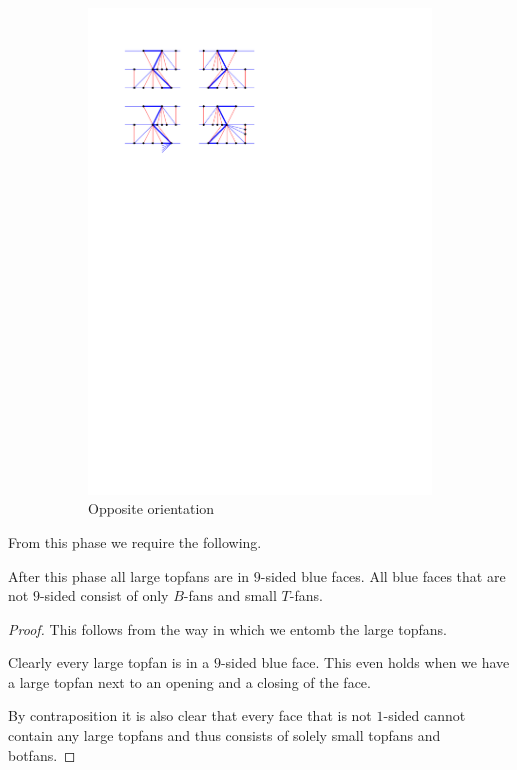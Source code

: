 \begin{figure}
\begin{subfigure}[b]{0.45 \textwidth}
          \includegraphics[width =\textwidth]{unifiedAlgo/img/post/oppChain}
          \caption{Opposite orientation}
      \end{subfigure}
      \caption{}
      \label{fig:uni:chains}
    \end{figure}

    From this phase we require the following.
    \begin{lemma}
      \label{lm:}
      After this phase all large topfans are in $9$-sided blue faces. All blue faces that are not $9$-sided consist of only $B$-fans and small $T$-fans.
    \end{lemma}

    \begin{proof}
      This follows from the way in which we entomb the large topfans.

      Clearly every large topfan is in a $9$-sided blue face. This even holds when we have a large topfan next to an opening and a closing of the face.

       By contraposition it is also clear that every face that is not $1$-sided cannot contain any large topfans and  thus consists of solely small topfans and botfans.
    \end{proof}

